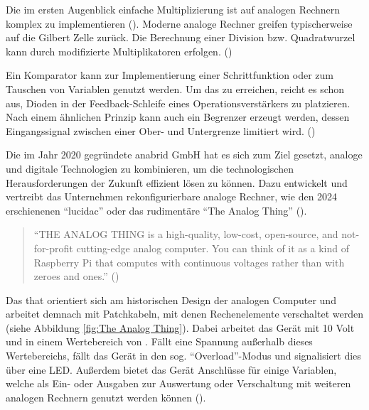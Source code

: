 Die im ersten Augenblick einfache Multiplizierung ist auf analogen Rechnern komplex zu implementieren (\cite[vgl. S. 105]{Ulmann2022}). Moderne analoge Rechner greifen typischerweise auf die Gilbert Zelle zurück. Die Berechnung einer Division bzw. Quadratwurzel kann durch modifizierte Multiplikatoren erfolgen. (\cite[S. 114 f.]{Ulmann2022})

Ein Komparator kann \zb zur Implementierung einer Schrittfunktion oder zum Tauschen von Variablen genutzt werden. Um das zu erreichen, reicht es schon aus, Dioden in der Feedback-Schleife eines Operationsverstärkers zu platzieren. Nach einem ähnlichen Prinzip kann auch ein Begrenzer erzeugt werden, dessen Eingangssignal zwischen einer Ober- und Untergrenze limitiert wird. (\cite[S. 116]{Ulmann2022})

Die im Jahr 2020 gegründete anabrid GmbH hat es sich zum Ziel gesetzt, analoge und digitale Technologien zu kombinieren, um die technologischen Herausforderungen der Zukunft effizient lösen zu können. Dazu entwickelt und vertreibt das Unternehmen rekonfigurierbare analoge Rechner, wie den 2024 erschienenen "`lucidac"' oder das rudimentäre "`The Analog Thing"' (\cite{AnabridWebsite}).

\begin{quote}
  "`THE ANALOG THING is a high-quality, low-cost, open-source, and not-for-profit cutting-edge analog computer. You can think of it as a kind of Raspberry Pi that computes with continuous voltages rather than with zeroes and ones."' (\cite{TheAnalogThingDocs})
\end{quote}

Das \ac{that} orientiert sich am historischen Design der analogen Computer und arbeitet demnach mit Patchkabeln, mit denen Rechenelemente verschaltet werden (siehe Abbildung \ref{fig:The Analog Thing}). Dabei arbeitet das Gerät mit 10 Volt und in einem Wertebereich von . Fällt eine Spannung außerhalb dieses Wertebereichs, fällt das Gerät in den sog. "`Overload"'-Modus und signalisiert dies über eine LED. Außerdem bietet das Gerät Anschlüsse für einige Variablen, welche als Ein- oder Ausgaben zur Auswertung oder Verschaltung mit weiteren analogen Rechnern genutzt werden können (\cite{TheAnalogThingDocs}).

